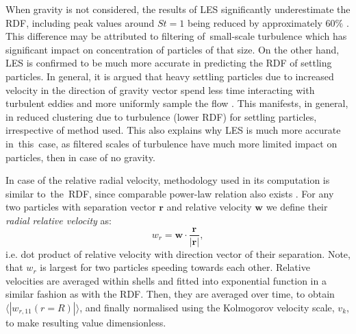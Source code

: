 \documentclass{pracamgren}
\begin{document}
When gravity is not considered, the results of LES significantly underestimate the RDF, including peak values around $St=1$ being reduced by approximately $60 \%$ \parencite{Fede2006,Yang2008,Marchioli2008}.
This difference may be attributed to filtering of~small-scale turbulence which has significant impact on concentration of particles of that size.
On the other hand, LES is confirmed \parencite[see][]{Rosa2017} to be much more accurate in predicting the RDF of settling particles.
In general, it is argued that heavy settling particles due to increased velocity in the direction of gravity vector spend less time interacting with turbulent eddies and more uniformly sample the flow \parencite{Ireland2016}.
This manifests, in general, in reduced clustering due to turbulence (lower RDF) for settling particles, irrespective of method used.
This also explains why LES is much more accurate in~this~case, as filtered scales of turbulence have much more limited impact on particles, then in case of no gravity.

\smallskip

In case of the relative radial velocity, methodology used in its computation is similar to~the~RDF, since comparable power-law relation also exists \parencite[Equation 13]{Rosa2013}.
For any two particles with separation vector $\mathbf{r}$ and relative velocity $\mathbf{w}$ we define their \emph{radial relative velocity} as:
\begin{equation}
w_r = \mathbf{w} \cdot \frac{\mathbf{r}}{|\mathbf{r}|} ,
\label{eqn:rrv}
\end{equation} 
i.e. dot product of relative velocity with direction vector of their separation.
Note, that $w_r$ is largest for two particles speeding towards each other.
Relative velocities are averaged within shells and fitted into exponential function in a similar fashion as with the RDF.
Then, they are averaged over time, to obtain $\langle|w_{r, 11}(r = R)|\rangle$, and finally normalised using the Kolmogorov velocity scale, $v_k$, to make resulting value dimensionless.
\end{document}

